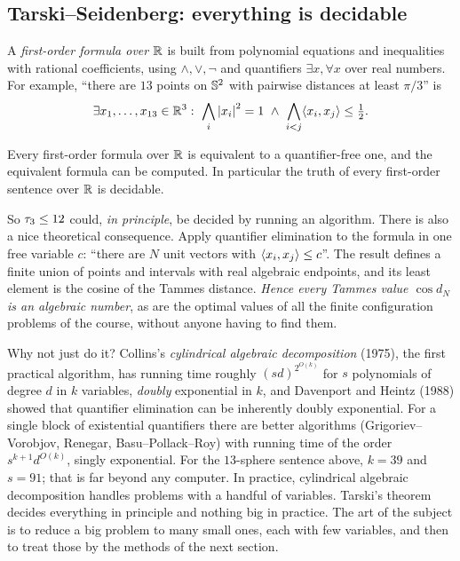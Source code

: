 \subsection{Tarski--Seidenberg: everything is decidable}
A \emph{first-order formula over $\mathbb{R}$} is built from polynomial equations and inequalities with rational
coefficients, using $\wedge,\vee,\neg$ and quantifiers $\exists x,\forall x$ over real numbers. For example,
``there are $13$ points on $\mathbb{S}^2$ with pairwise distances at least $\pi/3$'' is
\[
  \exists x_1,\dots,x_{13}\in\R^3:\ \bigwedge_i\abs{x_i}^2=1\ \wedge\ \bigwedge_{i<j}\ip{x_i}{x_j}\le\tfrac12 .
\]

\begin{theorem}
Every first-order formula over $\mathbb{R}$ is equivalent to a quantifier-free one, and the equivalent formula can
be computed. In particular the truth of every first-order sentence over $\mathbb{R}$ is decidable.
\end{theorem}

So $\tau_3\le12$ could, \emph{in principle}, be decided by running an algorithm. There is also a
nice theoretical consequence. Apply quantifier elimination to the formula in one free variable
$c$: ``there are $N$ unit vectors with $\langle x_i, x_j\rangle\le c$''. The result defines a finite union of
points and intervals with real algebraic endpoints, and its least element is the cosine of the Tammes
distance. \emph{Hence every Tammes value $\cos d_N$ is an algebraic number}, as are the optimal
values of all the finite configuration problems of the course, without anyone having to find them.

Why not just do it? Collins's \emph{cylindrical algebraic decomposition} (1975), the first practical
algorithm, has running time roughly $(sd)^{2^{O(k)}}$ for $s$ polynomials of degree $d$ in $k$ variables,
\emph{doubly} exponential in $k$, and Davenport and Heintz (1988) showed that quantifier elimination
can be inherently doubly exponential. For a single block of existential quantifiers there are better
algorithms (Grigoriev--Vorobjov, Renegar, Basu--Pollack--Roy) with running time of the order
$s^{k+1}d^{O(k)}$, singly exponential. For the $13$-sphere sentence above, $k=39$ and $s=91$; that is far
beyond any computer. In practice, cylindrical algebraic decomposition handles problems with a handful of
variables. Tarski's theorem decides everything in principle and nothing big in practice. The art of
the subject is to reduce a big problem to many small ones, each with few variables, and then to treat
those by the methods of the next section.

